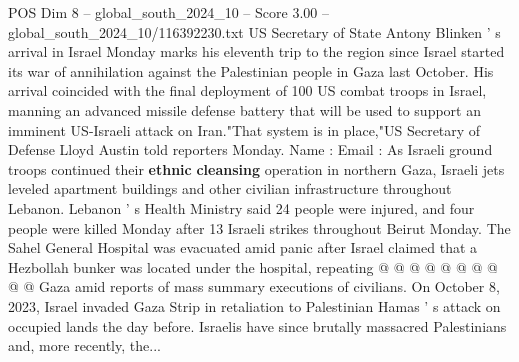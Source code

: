 \begin{textsample}{POS Dim 8 – global\_south\_2024\_10 – Score 3.00 – global\_south\_2024\_10/116392230.txt}
US Secretary of State Antony Blinken ' s arrival in Israel Monday marks his eleventh trip to the region since Israel started its war of annihilation against the Palestinian people in Gaza last October.
His arrival coincided with the final deployment of 100 US combat troops in Israel, manning an advanced missile defense battery that will be used to support an imminent US-Israeli attack on Iran."That system is in place,"US Secretary of Defense Lloyd Austin told reporters Monday.
Name : Email : As Israeli ground troops continued their \textbf{ethnic} \textbf{cleansing} operation in northern Gaza, Israeli jets leveled apartment buildings and other civilian infrastructure throughout Lebanon.
Lebanon ' s Health Ministry said 24 people were injured, and four people were killed Monday after 13 Israeli strikes throughout Beirut Monday.
The Sahel General Hospital was evacuated amid panic after Israel claimed that a Hezbollah bunker was located under the hospital, repeating @ @ @ @ @ @ @ @ @ @ Gaza amid reports of mass summary executions of civilians.
On October 8, 2023, Israel invaded Gaza Strip in retaliation to Palestinian Hamas ' s attack on occupied lands the day before.
Israelis have since brutally massacred Palestinians and, more recently, the...

\end{textsample}

